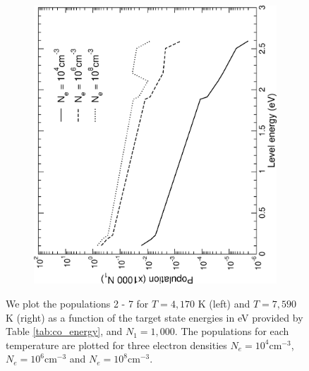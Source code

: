\begin{figure}
\begin{subfigure}{0.45\textwidth}
\includegraphics[scale=0.48, angle=-90]{Figures/Cobalt/modelling/populations/population2.eps} 
    \end{subfigure}
\caption{We plot the populations 2 - 7 for $T=4,170$ K (left) and $T=7,590$ K (right) as a function of the target state energies in eV provided by Table \ref{tab:co_energy}, and $N_1 = 1,000$. The populations for each temperature are plotted for three electron densities $N_e = 10^4$cm$^{-3}$, $N_e = 10^6$cm$^{-3}$ and $N_e = 10^8$cm$^{-3}$. \label{fig:co_populations}}
\end{figure}
%

